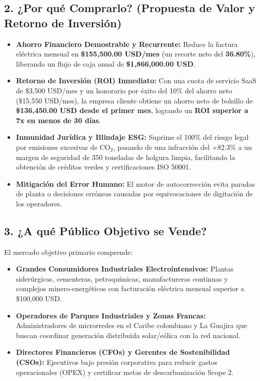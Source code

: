 \documentclass[11pt,a4paper]{article}
\begin{document}
\subsection{2. ¿Por qué Comprarlo? (Propuesta de Valor y Retorno de Inversión)}
\begin{itemize}
    \item \textbf{Ahorro Financiero Demostrable y Recurrente:} Reduce la factura eléctrica mensual en \textbf{\$155,500.00 USD/mes} (un recorte neto del \textbf{36.80\%}), liberando un flujo de caja anual de \textbf{\$1,866,000.00 USD}.
    \item \textbf{Retorno de Inversión (ROI) Inmediato:} Con una cuota de servicio SaaS de \$3,500 USD/mes y un honorario por éxito del 10\% del ahorro neto (\$15,550 USD/mes), la empresa cliente obtiene un ahorro neto de bolsillo de \textbf{\$136,450.00 USD desde el primer mes}, logrando un \textbf{ROI superior a 7x en menos de 30 días}.
    \item \textbf{Inmunidad Jurídica y Blindaje ESG:} Suprime el 100\% del riesgo legal por emisiones excesivas de $\text{CO}_2$, pasando de una infracción del +82.3\% a un margen de seguridad de 350 toneladas de holgura limpia, facilitando la obtención de créditos verdes y certificaciones ISO 50001.
    \item \textbf{Mitigación del Error Humano:} El motor de autocorrección evita paradas de planta o decisiones erróneas causadas por equivocaciones de digitación de los operadores.
\end{itemize}

\subsection{3. ¿A qué Público Objetivo se Vende?}
El mercado objetivo primario comprende:
\begin{itemize}
    \item \textbf{Grandes Consumidores Industriales Electrointensivos:} Plantas siderúrgicas, cementeras, petroquímicas, manufactureras continuas y complejos minero-energéticos con facturación eléctrica mensual superior a \$100,000 USD.
    \item \textbf{Operadores de Parques Industriales y Zonas Francas:} Administradores de microrredes en el Caribe colombiano y La Guajira que buscan coordinar generación distribuida solar/eólica con la red nacional.
    \item \textbf{Directores Financieros (CFOs) y Gerentes de Sostenibilidad (CSOs):} Ejecutivos bajo presión corporativa para reducir gastos operacionales (OPEX) y certificar metas de descarbonización Scope 2.
\end{itemize}
\end{document}
